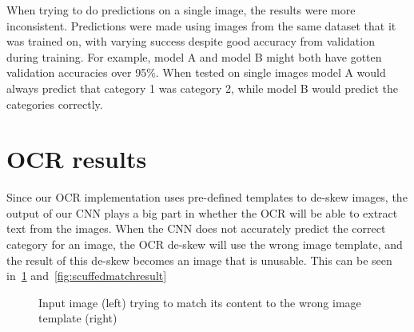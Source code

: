 When trying to do predictions on a single image, the results were more inconsistent.
Predictions were made using images from the same dataset that it was trained on, with varying success despite good accuracy from validation during training.
For example, model A and model B might both have gotten validation accuracies over 95\%.
When tested on single images model A would always predict that category 1 was category 2, while model B would predict the categories correctly.

\section{OCR results}\label{sec:ocr-results}
Since our OCR implementation uses pre-defined templates to de-skew images, the output of our CNN plays a big part in whether the OCR will be able to extract text from the images.
When the CNN does not accurately predict the correct category for an image, the OCR de-skew will use the wrong image template, and the result of this de-skew becomes an image that is unusable.
This can be seen in~\ref{fig:scuffedmatch2} and~\ref{fig:scuffedmatchresult}

\begin{figure}[h]
    \caption{Input image (left) trying to match its content to the wrong image template (right)}
    \label{fig:scuffedmatch2}
\end{figure}

